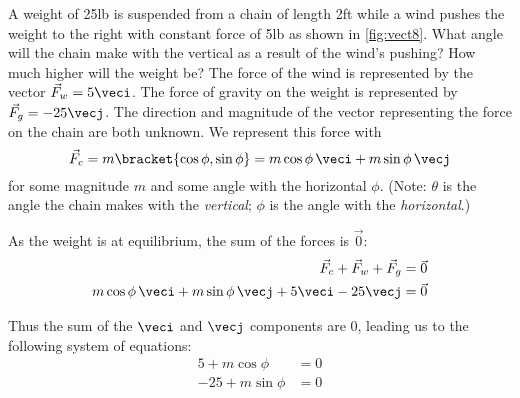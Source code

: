 \begin{example}\label{ex_vect8}
A
%
%
weight of 25lb is suspended from a chain of length 2ft while a wind pushes the weight to the right with constant force of 5lb as shown in \autoref{fig:vect8}. What angle will the chain make with the vertical as a result of the wind's pushing? How much higher will the weight be?
\solution
The force of the wind is represented by the vector $\vec F_w = 5\veci$. The force of gravity on the weight is represented by $\vec F_g = -25\vecj$. The direction and magnitude of the vector representing the force on the chain are both unknown. We represent this force with
\[\vec F_c = m\bracket{\cos\phi,\sin\phi}= m\cos\phi\, \veci + m\sin\phi\,\vecj\]
for some magnitude $m$ and some angle with the horizontal $\phi$. (Note: $\theta$ is the angle the chain makes with the \emph{vertical}; $\phi$ is the angle with the \emph{horizontal}.)

As the weight is at equilibrium, the sum of the forces is $\vec0$:
\begin{align*}
\vec F_c + \vec F_w + \vec F_g &= \vec 0\\
m\cos\phi\, \veci + m\sin\phi\,\vecj + 5\veci - 25\vecj &=\vec 0
\end{align*}

Thus the sum of the $\veci$ and $\vecj$ components are 0, leading us to the following system of equations:
\begin{align}
5+m\cos\phi &= 0\\
-25+m\sin\phi &= 0
\label{eq:vect8}
\end{align}


\end{example}
